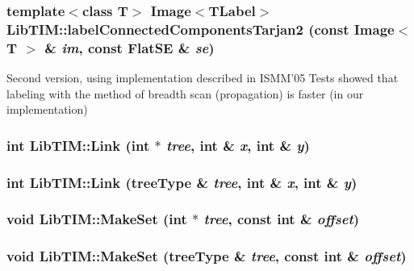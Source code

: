 \subsubsection{\setlength{\rightskip}{0pt plus 5cm}template$<$class T$>$ Image$<${\bf TLabel}$>$ Lib\-TIM::label\-Connected\-Components\-Tarjan2 (const Image$<$ T $>$ \& {\em im}, const Flat\-SE \& {\em se})}\label{group__Tarjan_ga9}


Second version, using implementation described in ISMM'05 Tests showed that labeling with the method of breadth scan (propagation) is faster (in our implementation) 
\subsubsection{\setlength{\rightskip}{0pt plus 5cm}int Lib\-TIM::Link (int $\ast$ {\em tree}, int \& {\em x}, int \& {\em y})}\label{group__Tarjan_ga7}


\subsubsection{\setlength{\rightskip}{0pt plus 5cm}int Lib\-TIM::Link ({\bf tree\-Type} \& {\em tree}, int \& {\em x}, int \& {\em y})}\label{group__Tarjan_ga4}


\subsubsection{\setlength{\rightskip}{0pt plus 5cm}void Lib\-TIM::Make\-Set (int $\ast$ {\em tree}, const int \& {\em offset})}\label{group__Tarjan_ga5}


\subsubsection{\setlength{\rightskip}{0pt plus 5cm}void Lib\-TIM::Make\-Set ({\bf tree\-Type} \& {\em tree}, const int \& {\em offset})}\label{group__Tarjan_ga1}


